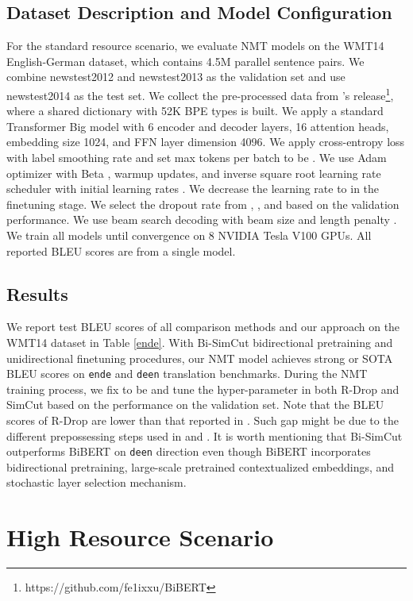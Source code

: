\documentclass[11pt]{article}
\begin{document}
\subsection{Dataset Description and Model Configuration}

For the standard resource scenario, we evaluate NMT models on the WMT14 English-German dataset, which contains 4.5M parallel sentence pairs. We combine newstest2012 and newstest2013 as the validation set and use newstest2014 as the test set. We collect the pre-processed data from \citet{xu-etal-2021-bert}'s release\footnote{https://github.com/fe1ixxu/BiBERT}, where a shared dictionary with 52K BPE types is built. We apply a standard Transformer Big model with 6 encoder and decoder layers, 16 attention heads, embedding size 1024, and FFN layer dimension 4096. We apply cross-entropy loss with label smoothing rate  and set max tokens per batch to be . We use Adam optimizer with Beta ,  warmup updates, and inverse square root learning rate scheduler with initial learning rates . We decrease the learning rate to  in the finetuning stage. We select the dropout rate from , , and  based on the validation performance. We use beam search decoding with beam size  and length penalty . We train all models until convergence on 8 NVIDIA Tesla V100 GPUs. All reported BLEU scores are from a single model. 

\subsection{Results}

We report test BLEU scores of all comparison methods and our approach on the WMT14 dataset in Table \ref{ende}. With Bi-SimCut bidirectional pretraining and unidirectional finetuning procedures, our NMT model achieves strong or SOTA BLEU scores on \texttt{en}\texttt{de} and \texttt{de}\texttt{en} translation benchmarks. During the NMT training process, we fix  to be  and tune the hyper-parameter  in both R-Drop and SimCut based on the performance on the validation set. Note that the BLEU scores of R-Drop are lower than that reported in \citet{liang2021r}. Such gap might be due to the different prepossessing steps used in \citet{liang2021r} and \citet{xu-etal-2021-bert}. It is worth mentioning that Bi-SimCut outperforms BiBERT on \texttt{de}\texttt{en} direction even though BiBERT incorporates bidirectional pretraining, large-scale pretrained contextualized embeddings, and stochastic layer selection mechanism.


\section{High Resource Scenario}\label{high-resource}
\end{document}
